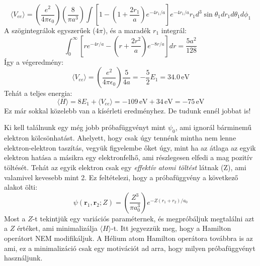 \documentclass[../main.tex]{subfiles}
\begin{document}
\begin{equation}
    \langle V_{ee} \rangle = \left(\frac{e^2}{4 \pi \epsilon_0}\right) \left(\frac{8}{\pi a^3}\right) \int \left[1 - \left(1 + \frac{2r_1}{a}\right) e^{-4 r_1 / a}\right] e^{-4 r_1 / a} r_1 d^3 \sin \theta_1 d r_1 d \theta_1 d \phi_1
\end{equation}
A szögintegrálok egyszerűek ($4\pi$), és a maradék $r_1$ integrál:
\begin{equation}
    \int_{0}^{\infty} \left[re^{-4r/a} - \left(r + \frac{2r^2}{a}\right)e^{-8r/a}\right] dr = \frac{5 a^2}{128}
\end{equation}
Így a végeredmény:
\begin{equation}
    \langle V_{ee} \rangle = \left(\frac{e^2}{4 \pi \epsilon_0}\right) \frac{5}{4 a} = - \frac{5}{2} E_1 = 34.0 \, \text{eV}
\end{equation}
Tehát a teljes energia:
\begin{equation}
    \langle H \rangle = 8 E_1 + \langle V_{ee} \rangle = -109 \, \text{eV} + 34 \, \text{eV} = -75 \, \text{eV}
\end{equation}
Ez már sokkal közelebb van a kísérleti eredményhez. De tudunk ennél jobbat is! 

Ki kell találnunk egy még jobb próbafüggvényt mint $\psi_0$, ami ignorál bárminemű elektron kölcsönhatást. Ahelyett, hogy csak úgy tennénk mintha nem lenne elektron-elektron taszítás,
vegyük figyelembe őket úgy, mint ha az átlaga az egyik elektron hatása a másikra egy elektronfelhő, ami részlegesen elfedi a mag pozitív töltését. Tehát az egyik elektron csak egy \textit{effektív atomi töltést}
látnak (Z), ami valamivel kevesebb mint 2. Ez feltételezi, hogy a próbafüggvény a következő alakot ölti:
\begin{equation}
    \psi(\mathbf{r}_1, \mathbf{r}_2; Z) = \left(\frac{Z^3}{\pi a_0^3}\right) e^{-Z (r_1 + r_2) / a_0}
\end{equation}
Most a $Z$-t tekintjük egy variációs paraméternek, és megpróbáljuk megtalálni azt a $Z$ értéket, ami minimalizálja $\langle H \rangle$-t. Itt jegyezzük meg, hogy a Hamilton operátort NEM modifikáljuk.
A Hélium atom Hamilton operátora továbbra is az ami, ez a minimalizáció csak egy motivációt ad arra, hogy milyen próbafüggvényt használjunk.
\end{document}

